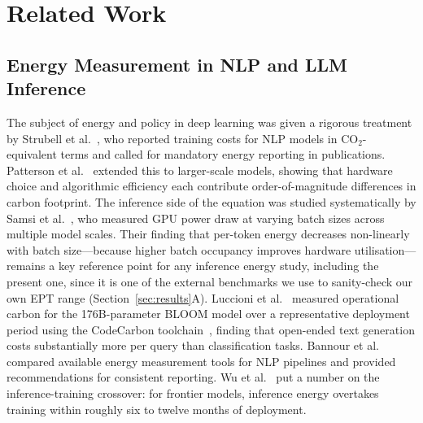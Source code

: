 \documentclass[conference]{IEEEtran}
\begin{document}
\section{Related Work}
\subsection{Energy Measurement in NLP and LLM Inference}
The subject of energy and policy in deep learning was given a
rigorous treatment by Strubell et al.~\cite{strubell2019energy}, who
reported training costs for NLP models in CO$_2$-equivalent terms and
called for mandatory energy reporting in publications. Patterson et
al.~\cite{patterson2022carbon} extended this to larger-scale models,
showing that hardware choice and algorithmic efficiency each
contribute order-of-magnitude differences in carbon footprint.
The inference side of the equation was studied systematically by
Samsi et al.~\cite{samsi2023words}, who measured GPU power draw at
varying batch sizes across multiple model scales. Their finding that
per-token energy decreases non-linearly with batch size---because
higher batch occupancy improves hardware utilisation---remains a key
reference point for any inference energy study, including the present
one, since it is one of the external benchmarks we use to sanity-check
our own EPT range (Section~\ref{sec:results}A). Luccioni et
al.~\cite{luccioni2023estimating} measured operational carbon for the
176B-parameter BLOOM model over a representative deployment period
using the CodeCarbon toolchain~\cite{lacoste2019quantifying}, finding
that open-ended text generation costs substantially more per query
than classification tasks. Bannour et al.~\cite{bannour2021evaluating}
compared available energy measurement tools for NLP pipelines and
provided recommendations for consistent reporting. Wu et
al.~\cite{wu2022sustainable} put a number on the inference-training
crossover: for frontier models, inference energy overtakes training
within roughly six to twelve months of deployment.
\end{document}
